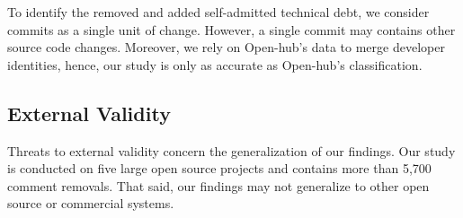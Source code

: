 To identify the removed and added self-admitted technical debt, we consider commits as a single unit of change. However, a single commit may contains other source code changes. Moreover, we rely on Open-hub's data to merge developer identities, hence, our study is only as accurate as Open-hub's classification.

\subsection{External Validity} Threats to external validity concern the generalization of our findings. Our study is conducted on five large open source projects and contains more than 5,700 comment removals. That said, our findings may not generalize to other open source or commercial systems.